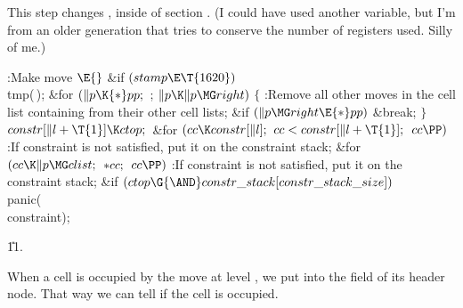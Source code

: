 This step changes , inside of section .
(I could have used another variable, but I'm from an older generation
that tries to conserve the number of registers used. Silly of me.)

\Y\B\4:Make move \X${}\E{}$\6
\&{if} ${}(\\{stamp}\E\T{1620}){}$\1\5
\\{tmp}(\,);\2\6
\&{for} ${}(\|p\K{*}\\{pp};{}$  ; ${}\|p\K\|p\MG\\{right}){}$\5
${}\{{}$\1\6
:Remove all other moves in the cell list containing  from their
other cell lists\X;\6
\&{if} ${}(\|p\MG\\{right}\E{*}\\{pp}){}$\1\5
\&{break};\2\6
\4${}\}{}$\2\6
${}\\{constr}[\|l+\T{1}]\K\\{ctop};{}$\6
\&{for} ${}(\\{cc}\K\\{constr}[\|l];{}$ ${}\\{cc}<\\{constr}[\|l+\T{1}];{}$ ${}%
\\{cc}\PP){}$\1\5
:If constraint  is not satisfied, put it on the
constraint stack\X;\2\6
\&{for} ${}(\\{cc}\K\|p\MG\\{clist};{}$ ${}{*}\\{cc};{}$ ${}\\{cc}\PP){}$\1\5
:If constraint  is not satisfied, put it on the
constraint stack\X;\2\6
\&{if} ${}(\\{ctop}\G{\AND}\\{constr\_stack}[\\{constr\_stack\_size}]){}$\1\5
\\{panic}(\\{constraint});\2\par
\U11.\fi

When a cell is occupied by the move at level , we put  into
the  field of its header node. That way we can tell if the
cell is occupied.

